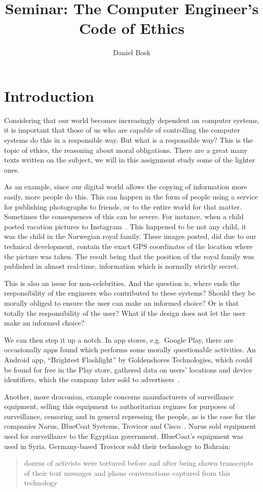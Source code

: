 \documentclass{llncs}
\title{Seminar: The Computer Engineer's Code of Ethics}
\author{%
  Daniel Bosk
}
\institute{%
  Department of Information and Communication Systems\\
  Mid Sweden University, Sundsvall
}
\begin{document}
\maketitle


\section{Introduction}

Considering that our world becomes increasingly dependent on computer systems, 
it is important that those of us who are capable of controlling the computer 
systems do this in a responsible way.
But what is a responsible way?
This is the topic of ethics, the reasoning about moral obligations.
There are a great many texts written on the subject, we will in this assignment 
study some of the lighter ones.

As an example, since our digital world allows the copying of information more 
easily, more people do this.
This can happen in the form of people using a service for publishing 
photographs to friends, or to the entire world for that matter.
Sometimes the consequences of this can be severe.
For instance, when a child posted vacation pictures to 
Instagram~\cite{Roberts2012wia}.
This happened to be not any child, it was the child in the Norwegian royal 
family.
These images posted, did due to our technical development, contain the exact 
GPS coordinates of the location where the picture was taken.
The result being that the position of the royal family was published in almost 
real-time, information which is normally strictly secret.

This is also an issue for non-celebrities.
And the question is, where ends the responsibility of the engineers who 
contributed to these systems?
Should they be morally obliged to ensure the user can make an informed choice?
Or is that totally the responsibility of the user?
What if the design does not let the user make an informed choice?

We can then step it up a notch.
In app stores, e.g.\ Google Play, there are occasionally apps found which 
performs some morally questionable activities.
An Android app, ``Brightest Flashlight'' by Goldenshores Technologies, which 
could be found for free in the Play store, gathered data on users' locations 
and device identifiers, which the company later sold to 
advertisers~\cite{garber2014roundup}.

Another, more draconian, example concerns manufacturers of surveillance 
equipment, selling this equipment to authoritarian regimes for purposes of 
surveillance, censoring and in general repressing the people, as is the case 
for the companies Narus, BlueCoat Systems, Trovicor and 
Cisco~\cite{effsurveil}.
Narus sold equipment used for surveillance to the Egyptian government.
BlueCoat's equipment was used in Syria.
Germany-based Trovicor sold their technology to Bahrain; 
\blockcquote{effsurveil}{dozens of activists were tortured before and after 
  being shown transcripts of their text messages and phone conversations 
  captured from this technology}.
\end{document}
